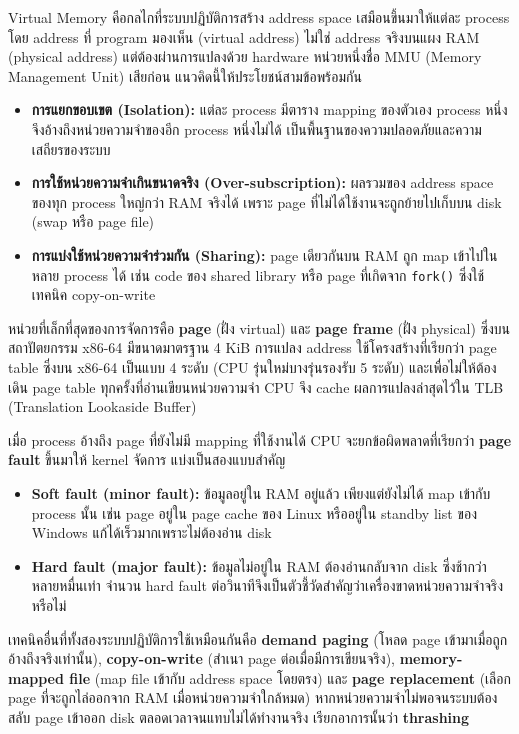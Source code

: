 \documentclass[a4paper,11pt]{article}
\newcommand{\code}[1]{\texttt{#1}}
\begin{document}
Virtual Memory คือกลไกที่ระบบปฏิบัติการสร้าง address space เสมือนขึ้นมาให้แต่ละ process โดย address ที่ program มองเห็น (virtual address) ไม่ใช่ address จริงบนแผง RAM (physical address) แต่ต้องผ่านการแปลงด้วย hardware หน่วยหนึ่งชื่อ MMU (Memory Management Unit) เสียก่อน แนวคิดนี้ให้ประโยชน์สามข้อพร้อมกัน

\begin{itemize}[leftmargin=*]
  \item \textbf{การแยกขอบเขต (Isolation):} แต่ละ process มีตาราง mapping ของตัวเอง process หนึ่งจึงอ้างถึงหน่วยความจำของอีก process หนึ่งไม่ได้ เป็นพื้นฐานของความปลอดภัยและความเสถียรของระบบ
  \item \textbf{การใช้หน่วยความจำเกินขนาดจริง (Over-subscription):} ผลรวมของ address space ของทุก process ใหญ่กว่า RAM จริงได้ เพราะ page ที่ไม่ได้ใช้งานจะถูกย้ายไปเก็บบน disk (swap หรือ page file)
  \item \textbf{การแบ่งใช้หน่วยความจำร่วมกัน (Sharing):} page เดียวกันบน RAM ถูก map เข้าไปในหลาย process ได้ เช่น code ของ shared library หรือ page ที่เกิดจาก \code{fork()} ซึ่งใช้เทคนิค copy-on-write
\end{itemize}

หน่วยที่เล็กที่สุดของการจัดการคือ \textbf{page} (ฝั่ง virtual) และ \textbf{page frame} (ฝั่ง physical) ซึ่งบนสถาปัตยกรรม x86-64 มีขนาดมาตรฐาน 4 KiB การแปลง address ใช้โครงสร้างที่เรียกว่า page table ซึ่งบน x86-64 เป็นแบบ 4 ระดับ (CPU รุ่นใหม่บางรุ่นรองรับ 5 ระดับ) และเพื่อไม่ให้ต้องเดิน page table ทุกครั้งที่อ่านเขียนหน่วยความจำ CPU จึง cache ผลการแปลงล่าสุดไว้ใน TLB (Translation Lookaside Buffer)

เมื่อ process อ้างถึง page ที่ยังไม่มี mapping ที่ใช้งานได้ CPU จะยกข้อผิดพลาดที่เรียกว่า \textbf{page fault} ขึ้นมาให้ kernel จัดการ แบ่งเป็นสองแบบสำคัญ

\begin{itemize}[leftmargin=*]
  \item \textbf{Soft fault (minor fault):} ข้อมูลอยู่ใน RAM อยู่แล้ว เพียงแต่ยังไม่ได้ map เข้ากับ process นั้น เช่น page อยู่ใน page cache ของ Linux หรืออยู่ใน standby list ของ Windows แก้ได้เร็วมากเพราะไม่ต้องอ่าน disk
  \item \textbf{Hard fault (major fault):} ข้อมูลไม่อยู่ใน RAM ต้องอ่านกลับจาก disk ซึ่งช้ากว่าหลายหมื่นเท่า จำนวน hard fault ต่อวินาทีจึงเป็นตัวชี้วัดสำคัญว่าเครื่องขาดหน่วยความจำจริงหรือไม่
\end{itemize}

เทคนิคอื่นที่ทั้งสองระบบปฏิบัติการใช้เหมือนกันคือ \textbf{demand paging} (โหลด page เข้ามาเมื่อถูกอ้างถึงจริงเท่านั้น), \textbf{copy-on-write} (สำเนา page ต่อเมื่อมีการเขียนจริง), \textbf{memory-mapped file} (map file เข้ากับ address space โดยตรง) และ \textbf{page replacement} (เลือก page ที่จะถูกไล่ออกจาก RAM เมื่อหน่วยความจำใกล้หมด) หากหน่วยความจำไม่พอจนระบบต้องสลับ page เข้าออก disk ตลอดเวลาจนแทบไม่ได้ทำงานจริง เรียกอาการนั้นว่า \textbf{thrashing}
\end{document}
